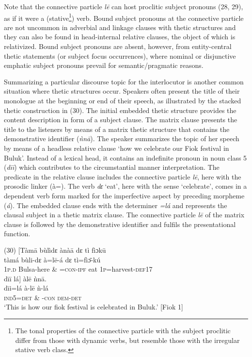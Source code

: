 \documentclass[output=paper]{langsci/langscibook}
\begin{document}
Note that the connective particle \textit{l\={e} }can host proclitic subject pronouns (28, 29), as if it were a (stative\footnote{ The tonal properties of the connective particle with the subject proclitic differ from those with dynamic verbs, but resemble those with the irregular stative verb class.}) verb. Bound subject pronouns at the connective particle are not uncommon in adverbial and linkage clauses with thetic structures and they can also be found in head-internal relative clauses, the object of which is relativized. Bound subject pronouns are absent, however, from entity-central thetic statements (or subject focus occurrences), where nominal or disjunctive emphatic subject pronouns prevail for semantic/pragmatic reasons.

Summarizing a particular discourse topic for the interlocutor is another common situation where thetic structures occur. Speakers often present the title of their monologue at the beginning or end of their speech, as illustrated by the stacked thetic construction in (30). The initial embedded thetic structure provides the content description in form of a subject clause. The matrix clause presents the title to the listeners by means of a matrix thetic structure that contains the demonstrative identifier (\textit{ǹn\={a}}). The speaker summarizes the topic of her speech by means of a headless relative clause ‘how we celebrate our Fiok festival in Buluk’. Instead of a lexical head, it contains an indefinite pronoun in noun class 5 (\textit{d\={i}\={i}}) which contributes to the circumstantial manner interpretation. The predicate in the relative clause includes the connective particle \textit{l\={e}},\textit{ }here with the prosodic linker (à=). The verb \textit{dɛ}\textit{}‘eat’, here with the sense ‘celebrate’, comes in a dependent verb form marked for the imperfective aspect by preceding morpheme (\textit{á}). The embedded clause ends with the determiner \textit{=lá }and represents the clausal subject in a thetic matrix clause. The connective particle \textit{l\={e} }of the matrix clause is followed by the demonstrative identifier and fulfils the presentational function.

\ea
\glll \textup{(30)}  \textup{[}Tàm\={a}  bùlìdɛ    ànà\={a}    dɛ  tì   fìɔk\={u}\\
  \textup{   tàmá  bùli-dɛ    à=l\={e}-á    dɛ  tì=fìɔ}\textup{\={ }}\textup{{}-kú}\\
       1\textsc{p}.\textsc{d}  Bulsa-here      \& =\textsc{con}{}-\textsc{ipf}    eat  1\textsc{p}=harvest-\textsc{def}17  \\
\glll   d\={i}\={i}  lá\textup{]  }àl\={e}    ǹn\={a}.\\
  \textup{  d\={i}i=lá    à-l\={e}    ǹ-lá}\\
     \textsc{  ind5=det     \& -con    dem-det}\\
\glt ‘This is how our fiok festival is celebrated in Buluk.’ [Fiok 1]
\z
\end{document}
